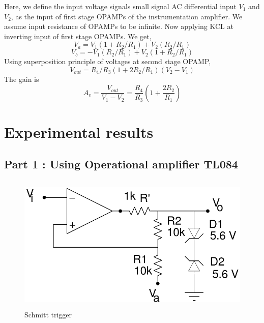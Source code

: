 \documentclass[12pt]{article}
\begin{document}
            \noindent
            Here, we define the input voltage signals small signal AC differential input $V_1$ and $V_2$, as the input of first stage OPAMPs of the instrumentation amplifier. We assume input resistance of OPAMPs to be infinite. Now applying KCL at inverting input of first stage OPAMPs. We get,
            \begin{equation}
                V_a = V_1(1 + R_2/R_1) + V_2(R_2/R_1)
            \end{equation}
            \begin{equation}
                V_b = - V_1(R_2/R_1) + V_2(1 + R_2/R_1)
            \end{equation}
            Using superposition principle of voltages at second stage OPAMP,
            \begin{equation}
                V_{out} = R_4/R_3(1 + 2R_2/R_1)(V_2 - V_1)
            \end{equation}
            The gain is
            \begin{equation}
                A_v = \frac{V_{out}}{V_1 - V_2} = \frac{R_4}{R_3}(1 + \frac{2R_2}{R_1})
            \end{equation}
            
    
\newpage
\section{Experimental results}

    \subsection{Part 1 : Using Operational amplifier TL084}
        \begin{figure}[H]
            \centering
            \includegraphics[width = 0.7\linewidth, height = 2.6in]{reports/lab2/scmidt.png}
            \caption{Schmitt trigger}
        \end{figure}
        
\end{document}
